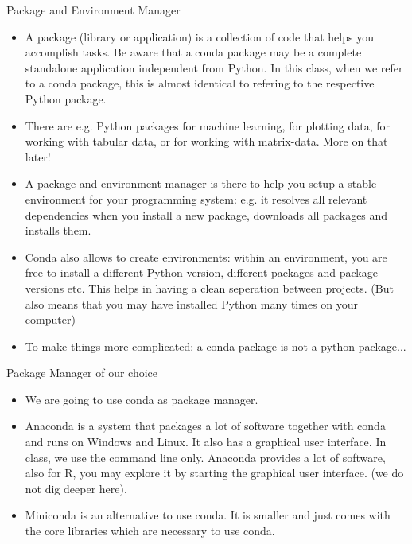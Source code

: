 \begin{frame}{Package and Environment Manager}
	\begin{itemize}
		\item A package (library or application) is a collection of code that helps you accomplish tasks. Be aware that a conda package may be a complete standalone application independent from Python. In this class, when we refer to a conda package, this is almost identical to refering to the respective Python package.
		\item There are e.g. Python packages for machine learning, for plotting data, for working with tabular data, or for working with matrix-data. More on that later!
		\item A package and environment  manager is there to help you setup a stable environment for your programming system: e.g. it resolves all relevant dependencies when you install a new package, downloads all packages and installs them.
		\item Conda also allows to create environments: within an environment, you are free to install a different Python version, different packages and package versions etc. This helps in having a clean seperation between projects. (But also means that you may have installed Python many times on your computer)
		\item To make things more complicated: a conda package is not a python package...
	\end{itemize}

\end{frame}


\begin{frame}{Package Manager of our choice}

	\begin{itemize}
		\item We are going to use conda as package manager.
		\item Anaconda is a system that packages a lot of software together with conda and runs on Windows and Linux. It also has a graphical user interface. In class, we use the command line only. Anaconda provides a lot of software, also for R, you may explore it by starting the graphical user interface. (we do not dig deeper here).
		\item Miniconda is an alternative to use conda. It is smaller and just comes with the core libraries which are necessary to use conda.

	\end{itemize}


\end{frame}

